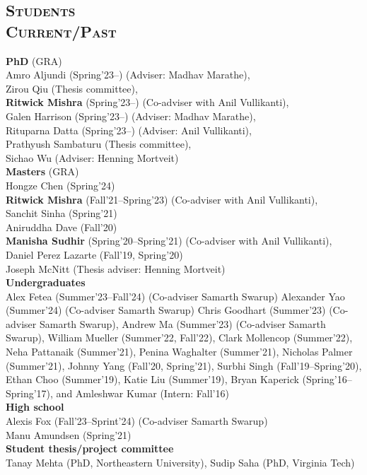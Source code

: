 \documentclass[margin,10pt]{res} %
\begin{document}
\begin{resume}
\section{\textnormal{\textsc{Students \\Current/Past}}}
\noindent\textbf{PhD} (GRA)\\
Amro Aljundi (Spring'23--) (Adviser: Madhav Marathe),\\
Zirou Qiu (Thesis committee),\\
\textbf{Ritwick Mishra} (Spring'23--) (Co-adviser with Anil
Vullikanti),\\
Galen Harrison (Spring'23--) (Adviser: Madhav Marathe),\\
Rituparna Datta (Spring'23--) (Adviser: Anil Vullikanti),\\
Prathyush Sambaturu (Thesis committee),\\
Sichao Wu (Adviser: Henning Mortveit)\vspace{.2cm}\\
\noindent\textbf{Masters} (GRA)\\
Hongze Chen (Spring'24)\\
\textbf{Ritwick Mishra} (Fall'21--Spring'23) (Co-adviser with Anil
Vullikanti),\\
Sanchit Sinha (Spring'21)\\
Aniruddha Dave (Fall'20)\\
\textbf{Manisha Sudhir} (Spring'20--Spring'21) (Co-adviser with Anil
Vullikanti),\\
Daniel Perez Lazarte (Fall'19, Spring'20)\\
Joseph McNitt (Thesis adviser: Henning Mortveit)\vspace{.2cm}\\
\noindent\textbf{Undergraduates}\\
Alex Fetea (Summer'23--Fall'24) (Co-adviser Samarth Swarup)
Alexander Yao (Summer'24) (Co-adviser Samarth Swarup)
Chris Goodhart (Summer'23) (Co-adviser Samarth Swarup),
Andrew Ma (Summer'23) (Co-adviser Samarth Swarup),
William Mueller (Summer'22, Fall'22),
Clark Mollencop (Summer'22),
Neha Pattanaik (Summer'21),
Penina Waghalter (Summer'21),
Nicholas Palmer (Summer'21),
Johnny Yang (Fall'20, Spring'21),
Surbhi Singh (Fall'19--Spring'20),
Ethan Choo (Summer'19),
Katie Liu (Summer'19),
Bryan Kaperick (Spring'16--Spring'17), and
Amleshwar Kumar (Intern: Fall'16) \vspace{.2cm}\\
\noindent\textbf{High school}\\
Alexis Fox (Fall'23--Sprint'24) (Co-adviser Samarth Swarup) \\
Manu Amundsen (Spring'21)\vspace{.2cm}\\
\noindent\textbf{Student thesis/project committee}\\
Tanay Mehta (PhD, Northeastern University),
Sudip Saha (PhD, Virginia Tech)

\end{resume}
\end{document}

